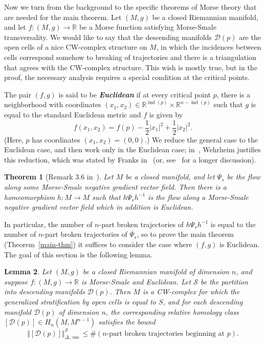 \documentclass[psamsfonts]{amsart}
\newtheorem{theorem}{Theorem}
\newtheorem{lemma}[theorem]{Lemma}
\theoremstyle{remark}
\newcommand{\abs}[1]{\left\lvert #1 \right\rvert}
\DeclareMathOperator{\ind}{ind}
\DeclareMathOperator{\ess}{ess}
\begin{document}
Now we turn from the background to the specific theorems of Morse theory that are needed for the main theorem.  Let $(M, g)$ be a closed Riemannian manifold, and let $f : (M, g) \rightarrow \mathbb{R}$ be a Morse function satisfying Morse-Smale transversality.  We would like to say that the descending manifolds $\mathcal{D}(p)$ are the open cells of a nice CW-complex structure on $M$, in which the incidences between cells correspond somehow to breaking of trajectories and there is a triangulation that agrees with the CW-complex structure.  This wish is mostly true, but in the proof, the necessary analysis requires a special condition at the critical points.  

The pair $(f, g)$ is said to be \textbf{\emph{Euclidean}} if at every critical point $p$, there is a neighborhood with coordinates $(x_1, x_2) \in \mathbb{R}^{\ind(p)} \times \mathbb{R}^{n-\ind(p)}$ such that $g$ is equal to the standard Euclidean metric and $f$ is given by
\[f(x_1, x_2) = f(p) - \frac{1}{2}\abs{x_1}^2 + \frac{1}{2} \abs{x_2}^2.\]
(Here, $p$ has coordinates $(x_1, x_2) = (0, 0)$.)  We reduce the general case to the Euclidean case, and then work only in the Euclidean case; in~\cite{Wehrheim12}, Wehrheim justifies this reduction, which was stated by Franks in~\cite{Franks79} (or, see~\cite{Qin11} for a longer discussion).

\begin{theorem}[Remark 3.6 in~\cite{Wehrheim12}]\label{reduction}
Let $M$ be a closed manifold, and let $\Psi_s$ be the flow along some Morse-Smale negative gradient vector field.  Then there is a homeomorphism $h : M \rightarrow M$ such that $h \Psi_s h^{-1}$ is the flow along a Morse-Smale negative gradient vector field which in addition is Euclidean.
\end{theorem}

In particular, the number of $n$-part broken trajectories of $h \Psi_s h^{-1}$ is equal to the number of $n$-part broken trajectories of $\Psi_s$, so to prove the main theorem (Theorem~\ref{main-thm}) it suffices to consider the case where $(f, g)$ is Euclidean.  The goal of this section is the following lemma.

\begin{lemma}\label{morse-goal}
Let $(M, g)$ be a closed Riemannian manifold of dimension $n$, and suppose $f : (M, g) \rightarrow \mathbb{R}$ is Morse-Smale and Euclidean.  Let $\mathcal{S}$ be the partition into descending manifolds $\mathcal{D}(p)$.  Then $M$ is a CW-complex for which the generalized stratification by open cells is equal to $S$, and for each descending manifold $\mathcal{D}(p)$ of dimension $n$, the corresponding relative homology class $[\mathcal{D}(p)] \in H_n(M, M^{n-1})$ satisfies the bound
\[\Vert [\mathcal{D}(p)] \Vert_{\Delta, \ess}^{\mathcal{S}} \leq \#(n\text{-part broken trajectories beginning at }p).\]
\end{lemma}
\end{document}
